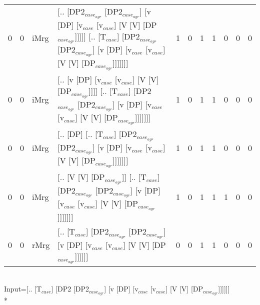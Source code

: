 \begin{tabularx}{\linewidth}{rrlXrrrrrrr}
   0 &   0 & iMrg & [.. [DP2$_{case_{agr}}$ [DP2$_{case_{agr}}$] [v [DP] [v$_{case}$ [v$_{case}$] [V [V] [DP$_{case_{agr}}$]]]]] [.. [T$_{case}$] [DP2$_{case_{agr}}$ [DP2$_{case_{agr}}$] [v [DP] [v$_{case}$ [v$_{case}$] [V [V] [DP$_{case_{agr}}$]]]]]]] &            1 &              0 &             1 &             1 &                  0 &            0 &              0 \\
   0 &   0 & iMrg & [.. [v [DP] [v$_{case}$ [v$_{case}$] [V [V] [DP$_{case_{agr}}$]]]] [.. [T$_{case}$] [DP2$_{case_{agr}}$ [DP2$_{case_{agr}}$] [v [DP] [v$_{case}$ [v$_{case}$] [V [V] [DP$_{case_{agr}}$]]]]]]]                               &            1 &              0 &             1 &             1 &                  0 &            0 &              0 \\
   0 &   0 & iMrg & [.. [DP] [.. [T$_{case}$] [DP2$_{case_{agr}}$ [DP2$_{case_{agr}}$] [v [DP] [v$_{case}$ [v$_{case}$] [V [V] [DP$_{case_{agr}}$]]]]]]]                                                                           &            1 &              0 &             1 &             1 &                  0 &            0 &              0 \\
   0 &   0 & iMrg & [.. [V [V] [DP$_{case_{agr}}$]] [.. [T$_{case}$] [DP2$_{case_{agr}}$ [DP2$_{case_{agr}}$] [v [DP] [v$_{case}$ [v$_{case}$] [V [V] [DP$_{case_{agr}}$]]]]]]]                                                          &            1 &              0 &             1 &             1 &                  1 &            0 &              0 \\
   0 &   0 & rMrg & [.. [T$_{case}$] [DP2$_{case_{agr}}$ [DP2$_{case_{agr}}$] [v [DP] [v$_{case}$ [v$_{case}$] [V [V] [DP$_{case_{agr}}$]]]]]]                                                                                     &            0 &              0 &             1 &             1 &                  0 &            0 &              0 \\
\hline
\end{tabularx}\endgroup\\
\begingroup\scriptsize Input=[.. [T$_{case}$] [DP2 [DP2$_{case_{agr}}$] [v [DP] [v$_{case}$ [v$_{case}$] [V [V] [DP$_{case_{agr}}$]]]]]]\\*

